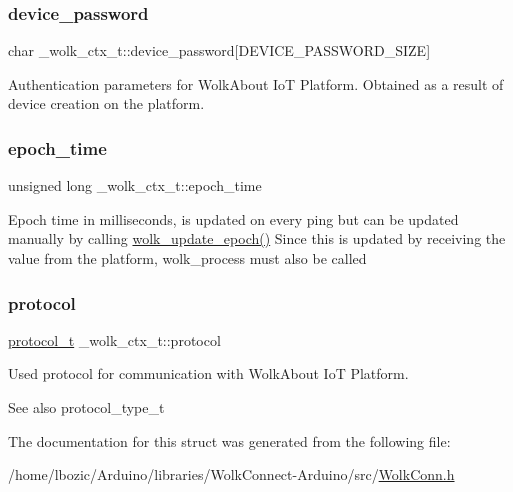 \subsubsection{\texorpdfstring{device\+\_\+password}{device\_password}}
{\footnotesize\ttfamily char \+\_\+wolk\+\_\+ctx\+\_\+t\+::device\+\_\+password\mbox{[}D\+E\+V\+I\+C\+E\+\_\+\+P\+A\+S\+S\+W\+O\+R\+D\+\_\+\+S\+I\+ZE\mbox{]}}

Authentication parameters for Wolk\+About IoT Platform. Obtained as a result of device creation on the platform. \mbox{\label{struct__wolk__ctx__t_a0c63c52881404b0305e8b4dba0b0b6a6}} 
\subsubsection{\texorpdfstring{epoch\+\_\+time}{epoch\_time}}
{\footnotesize\ttfamily unsigned long \+\_\+wolk\+\_\+ctx\+\_\+t\+::epoch\+\_\+time}

Epoch time in milliseconds, is updated on every ping but can be updated manually by calling \hyperlink{WolkConn_8h_afb2e5b566c8535cf38a7038909a36b6e}{wolk\+\_\+update\+\_\+epoch()} Since this is updated by receiving the value from the platform, wolk\+\_\+process must also be called \mbox{\label{struct__wolk__ctx__t_ab98629a506ce39393254cf331189dc9a}} 
\subsubsection{\texorpdfstring{protocol}{protocol}}
{\footnotesize\ttfamily \hyperlink{WolkConn_8h_a91e19fa4fff461493e1a41f7c7aa4e5f}{protocol\+\_\+t} \+\_\+wolk\+\_\+ctx\+\_\+t\+::protocol}

Used protocol for communication with Wolk\+About IoT Platform. \begin{DoxySeeAlso}{See also}
protocol\+\_\+type\+\_\+t 
\end{DoxySeeAlso}


The documentation for this struct was generated from the following file\+:\begin{DoxyCompactItemize}
\item 
/home/lbozic/\+Arduino/libraries/\+Wolk\+Connect-\/\+Arduino/src/\hyperlink{WolkConn_8h}{Wolk\+Conn.\+h}\end{DoxyCompactItemize}
